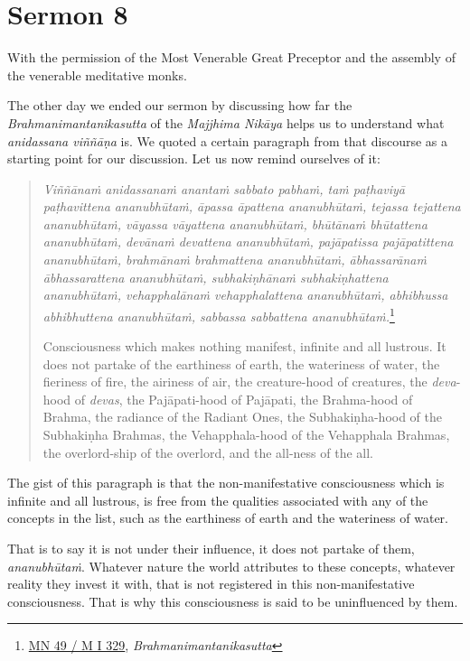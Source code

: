 \chapter{Sermon 8}

\NibbanaOpeningQuote

With the permission of the Most Venerable Great Preceptor and the assembly of the venerable meditative monks.

The other day we ended our sermon by discussing how far the \emph{Brahmanimantanikasutta} of the \emph{Majjhima Nikāya} helps us to understand what \emph{anidassana viññāṇa} is. We quoted a certain paragraph from that discourse as a starting point for our discussion. Let us now remind ourselves of it:

\begin{quote}
\emph{Viññānaṁ anidassanaṁ anantaṁ sabbato pabhaṁ, taṁ paṭhaviyā paṭhavittena ananubhūtaṁ, āpassa āpattena ananubhūtaṁ, tejassa tejattena ananubhūtaṁ, vāyassa vāyattena ananubhūtaṁ, bhūtānaṁ bhūtattena ananubhūtaṁ, devānaṁ devattena ananubhūtaṁ, pajāpatissa pajāpatittena ananubhūtaṁ, brahmānaṁ brahmattena ananubhūtaṁ, ābhassarānaṁ ābhassarattena ananubhūtaṁ, subhakiṇhānaṁ subhakiṇhattena ananubhūtaṁ, vehapphalānaṁ vehapphalattena ananubhūtaṁ, abhibhussa abhibhuttena ananubhūtaṁ, sabbassa sabbattena ananubhūtaṁ.}\footnote{\href{https://suttacentral.net/mn49/pli/ms}{MN 49 / M I 329}, \emph{Brahmanimantanikasutta}}

Consciousness which makes nothing manifest, infinite and all lustrous. It does not partake of the earthiness of earth, the wateriness of water, the fieriness of fire, the airiness of air, the creature-hood of creatures, the \emph{deva}-hood of \emph{devas}, the Pajāpati-hood of Pajāpati, the Brahma-hood of Brahma, the radiance of the Radiant Ones, the Subhakiṇha-hood of the Subhakiṇha Brahmas, the Vehapphala-hood of the Vehapphala Brahmas, the overlord-ship of the overlord, and the all-ness of the all.
\end{quote}

The gist of this paragraph is that the non-manifestative consciousness which is infinite and all lustrous, is free from the qualities associated with any of the concepts in the list, such as the earthiness of earth and the wateriness of water.

That is to say it is not under their influence, it does not partake of them, \emph{ananubhūtaṁ}. Whatever nature the world attributes to these concepts, whatever reality they invest it with, that is not registered in this non-manifestative consciousness. That is why this consciousness is said to be uninfluenced by them.

